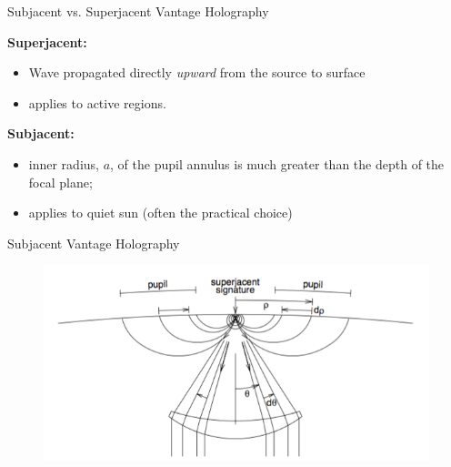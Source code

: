 \documentclass{beamer}
\begin{document}
\begin{frame}{Subjacent vs. Superjacent Vantage Holography}

    {\large\textcolor{cblue}{\textbf{Superjacent:}}}
    \begin{itemize}
        \item Wave propagated directly \emph{upward} from the source
            to surface
        \item applies to active regions.
    \end{itemize}
    {\large\textcolor{cblue}{\textbf{Subjacent:}}}
    \begin{itemize}
        \item inner radius, $a$, of the pupil annulus is much greater than
            the depth of the focal plane;
        \item applies to quiet sun (often the practical choice)
    \end{itemize}
\end{frame}
\begin{frame}{Subjacent Vantage Holography}
    \begin{figure}
        \includegraphics[width=\textwidth]{fig_4.png}
    \end{figure}
\end{frame}
\end{document}
